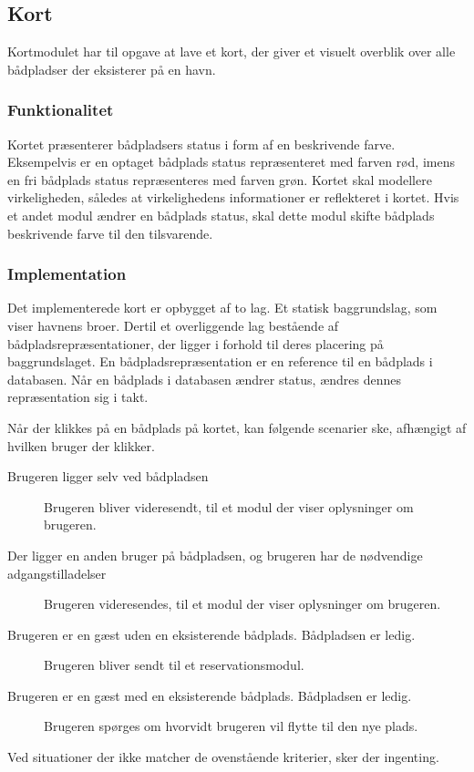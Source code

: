 \subsection{Kort}
\label{sub:kort}

Kortmodulet har til opgave at lave et kort, der giver et visuelt overblik over alle bådpladser der eksisterer på en havn.

\subsubsection{Funktionalitet}
\label{ssub:kort_funktionalitet}

Kortet præsenterer bådpladsers status i form af en beskrivende farve. Eksempelvis er en optaget bådplads status repræsenteret med farven rød, imens en fri bådplads status repræsenteres med farven grøn. Kortet skal modellere virkeligheden, således at virkelighedens informationer er reflekteret i kortet. Hvis et andet modul ændrer en bådplads status, skal dette modul skifte bådplads beskrivende farve til den tilsvarende. 


\subsubsection{Implementation}
\label{ssub:kort_implementation}

Det implementerede kort er opbygget af to lag. Et statisk baggrundslag, som viser havnens broer. Dertil et overliggende lag bestående af bådpladsrepræsentationer, der ligger i forhold til deres placering på baggrundslaget. En bådpladsrepræsentation er en reference til en bådplads i databasen. Når en bådplads i databasen ændrer status, ændres dennes repræsentation sig i takt.

Når der klikkes på en bådplads på kortet, kan følgende scenarier ske, afhængigt af hvilken bruger der klikker.

\begin{description}
  \item[Brugeren ligger selv ved bådpladsen] Brugeren bliver videresendt, til et modul der viser oplysninger om brugeren.
  \item[Der ligger en anden bruger på bådpladsen, og brugeren har de nødvendige adgangstilladelser] Brugeren videresendes, til et modul der viser oplysninger om brugeren.
  \item[Brugeren er en gæst uden en eksisterende bådplads. Bådpladsen er ledig.] Brugeren bliver sendt til et reservationsmodul.
  \item[Brugeren er en gæst med en eksisterende bådplads. Bådpladsen er ledig.] Brugeren spørges om hvorvidt brugeren vil flytte til den nye plads.
\end{description}

Ved situationer der ikke matcher de ovenstående kriterier, sker der ingenting.


